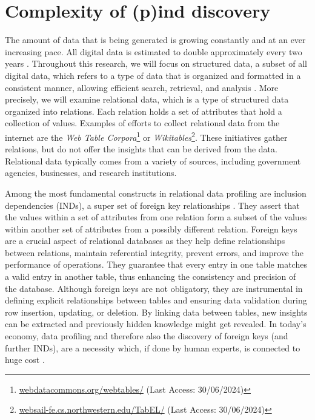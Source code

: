 \chapter{Complexity of (p)ind discovery}
The amount of data that is being generated is growing constantly and at an ever increasing pace. All digital data is estimated to double approximately every two years \cite{gantz2012digital}. Throughout this research, we will focus on structured data, a subset of all digital data, which refers to a type of data that is organized and formatted in a consistent manner, allowing efficient search, retrieval, and analysis \cite{gryz1998query}. More precisely, we will examine relational data, which is a type of structured data organized into relations. Each relation holds a set of attributes that hold a collection of values. Examples of efforts to collect relational data from the internet are the \textit{Web Table Corpora}\footnote{\href{https://webdatacommons.org/webtables/}{webdatacommons.org/webtables/} (Last Access: 30/06/2024)} or \textit{Wikitables}\footnote{\href{http://websail-fe.cs.northwestern.edu/TabEL/}{websail-fe.cs.northwestern.edu/TabEL/}  (Last Access: 30/06/2024)}. These initiatives gather relations, but do not offer the insights that can be derived from the data. Relational data typically comes from a variety of sources, including government agencies, businesses, and research institutions.

Among the most fundamental constructs in relational data profiling are inclusion dependencies (INDs), a super set of foreign key relationships \cite{casanova1982inclusion}. They assert that the values within a set of attributes from one relation form a subset of the values within another set of attributes from a possibly different relation. Foreign keys are a crucial aspect of relational databases as they help define relationships between relations, maintain referential integrity, prevent errors, and improve the performance of operations. They guarantee that every entry in one table matches a valid entry in another table, thus enhancing the consistency and precision of the database. Although foreign keys are not obligatory, they are instrumental in defining explicit relationships between tables and ensuring data validation during row insertion, updating, or deletion. By linking data between tables, new insights can be extracted and previously hidden knowledge might get revealed. In today's economy, data profiling and therefore also the discovery of foreign keys (and further INDs), are a necessity which, if done by human experts, is connected to huge cost \cite{halevy2006data}.\\

